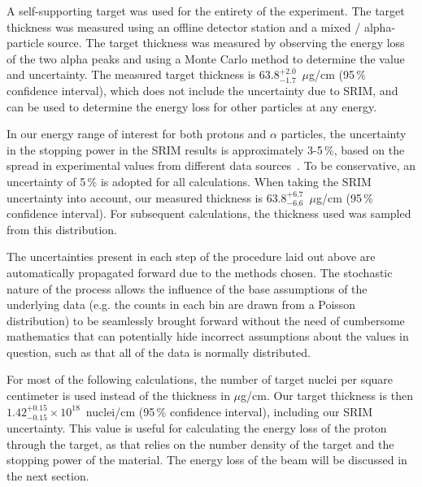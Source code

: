 A self-supporting  target was used for the entirety of the
experiment. The target thickness was measured using an offline detector
station and a mixed / alpha-particle source.
The target thickness was measured by observing the energy loss of the
two alpha peaks and using a Monte Carlo method to determine the value
and uncertainty. The measured target thickness is
$63.8^{+2.0}_{-1.7}$~$\mu$g/cm\squared{} (95\,\% confidence interval),
which does not include the uncertainty due to SRIM, and can be used to
determine the energy loss for other particles at any energy.

In our energy range of interest for both protons and $\alpha$ particles,
the uncertainty in the stopping power in the SRIM results is
approximately 3-5\,\%, based on the spread in experimental values from
different data sources~\cite{Paul2001}.
To be conservative, an uncertainty of 5\,\% is
adopted for all calculations. When taking the SRIM uncertainty into
account, our measured thickness is
$63.8^{+6.7}_{-6.6}$~$\mu$g/cm\squared{} (95\,\% confidence interval).
For subsequent calculations, the thickness used was sampled from this
distribution.


The uncertainties present in each step of the procedure laid out above
are automatically propagated forward due to the methods chosen. The
stochastic nature of the process allows the influence of the base
assumptions of the underlying data (e.g. the counts in each bin are
drawn from a Poisson distribution) to be seamlessly brought forward
without the need of cumbersome mathematics that can potentially hide
incorrect assumptions about the values in question, such as that all of
the data is normally distributed.

For most of the following calculations, the number of target nuclei per
square centimeter is used instead of the thickness in
$\mu$g/cm\squared{}. Our target thickness is then $1.42^{+0.15}_{-0.15}
\times 10^{18}$~nuclei/cm\squared{} (95\,\% confidence interval),
including our SRIM uncertainty. This value is useful for calculating the
energy loss of the proton through the target, as that relies on the
number density of the target and the stopping power of the material. The
energy loss of the beam will be discussed in the next section.


